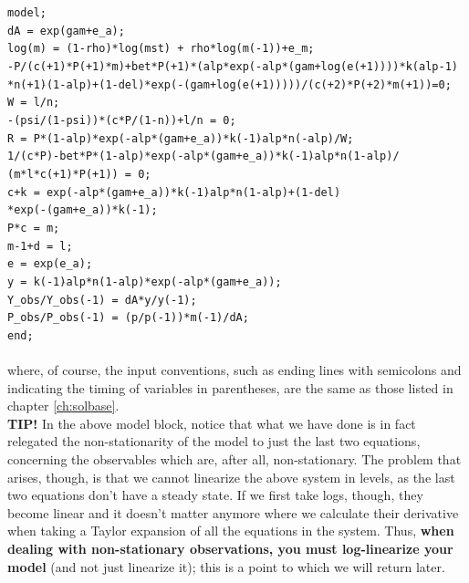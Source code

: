 \texttt{model;\\
dA = exp(gam+e\_a);\\
log(m) = (1-rho)*log(mst) + rho*log(m(-1))+e\_m;\\
-P/(c(+1)*P(+1)*m)+bet*P(+1)*(alp*exp(-alp*(gam+log(e(+1))))*k$\hat{}$(alp-1)\\
*n(+1)$\hat{}$(1-alp)+(1-del)*exp(-(gam+log(e(+1)))))/(c(+2)*P(+2)*m(+1))=0;\\
W = l/n;\\
-(psi/(1-psi))*(c*P/(1-n))+l/n = 0;\\
R = P*(1-alp)*exp(-alp*(gam+e\_a))*k(-1)$\hat{}$alp*n$\hat{}$(-alp)/W;\\
1/(c*P)-bet*P*(1-alp)*exp(-alp*(gam+e\_a))*k(-1)$\hat{}$alp*n$\hat{}$(1-alp)/\\
(m*l*c(+1)*P(+1)) = 0;\\
c+k = exp(-alp*(gam+e\_a))*k(-1)$\hat{}$alp*n$\hat{}$(1-alp)+(1-del)\\
*exp(-(gam+e\_a))*k(-1);\\
P*c = m;\\
m-1+d = l;\\
e = exp(e\_a);\\
y = k(-1)$\hat{}$alp*n$\hat{}$(1-alp)*exp(-alp*(gam+e\_a));\\
Y\_obs/Y\_obs(-1) = dA*y/y(-1);\\
P\_obs/P\_obs(-1) = (p/p(-1))*m(-1)/dA;\\
end;}\\
\\
where, of course, the input conventions, such as ending lines with semicolons and indicating the timing of variables in parentheses, are the same as those listed in chapter \ref{ch:solbase}. \\

\textsf{\textbf{TIP!}} In the above model block, notice that what we have done is in fact relegated the non-stationarity of the model to just the last two equations, concerning the observables which are, after all, non-stationary. The problem that arises, though, is that we cannot linearize the above system in levels, as the last two equations don't have a steady state. If we first take logs, though, they become linear and it doesn't matter anymore where we calculate their derivative when taking a Taylor expansion of all the equations in the system. Thus, \textbf{when dealing with non-stationary observations, you must log-linearize your model} (and not just linearize it); this is a point to which we will return later. 

